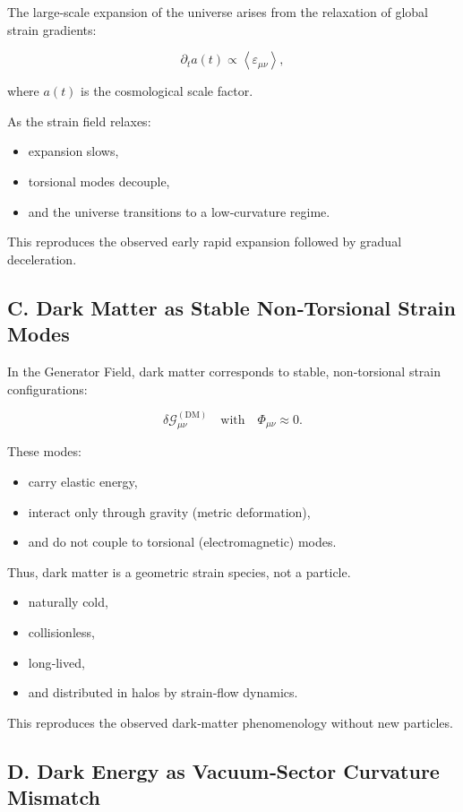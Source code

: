 \documentclass[reprint,amsmath,amssymb,aps,prl,floatfix]{revtex4-2}
\begin{document}
\begin{itemize}
The large‑scale expansion of the universe arises from the relaxation of global strain gradients:

\[
\partial_t a(t)
\propto
\left\langle \varepsilon_{\mu\nu} \right\rangle,
\]

where \(a(t)\) is the cosmological scale factor.
\medskip

As the strain field relaxes:
\begin{itemize}
\item expansion slows,  
\item torsional modes decouple,  
\item and the universe transitions to a low‑curvature regime.
\end{itemize}
\medskip

This reproduces the observed early rapid expansion followed by gradual deceleration.

\subsection{C. Dark Matter as Stable Non‑Torsional Strain Modes}

In the Generator Field, dark matter corresponds to stable, non‑torsional strain configurations:

\[
\delta\mathcal{G}_{\mu\nu}^{(\mathrm{DM})}
\quad\text{with}\quad
\Phi_{\mu\nu} \approx 0.
\]

These modes:
\begin{itemize}
\item carry elastic energy,  
\item interact only through gravity (metric deformation),  
\item and do not couple to torsional (electromagnetic) modes.
\end{itemize}

Thus, dark matter is a geometric strain species, not a particle.

\begin{itemize}
\item naturally cold,  
\item collisionless,  
\item long‑lived,  
\item and distributed in halos by strain‑flow dynamics.
\end{itemize}

This reproduces the observed dark‑matter phenomenology without new particles.

\subsection{D. Dark Energy as Vacuum‑Sector Curvature Mismatch}


\end{itemize}
\end{document}
